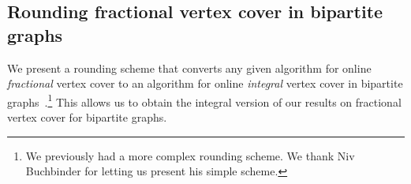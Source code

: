 \documentclass{article}
\begin{document}
%
%
%

\subsection{Rounding fractional vertex cover in bipartite graphs}
\label{sec:rounding}
We present a rounding scheme that converts any given algorithm for online {\em fractional} vertex cover to an algorithm for online {\em integral} vertex cover in bipartite graphs~\cite{NivPersonal}.\footnote{We previously had a more complex rounding scheme. We thank Niv Buchbinder for letting us present his simple scheme.} This allows us to obtain the integral version of our results on fractional vertex cover for bipartite graphs.
\end{document}
